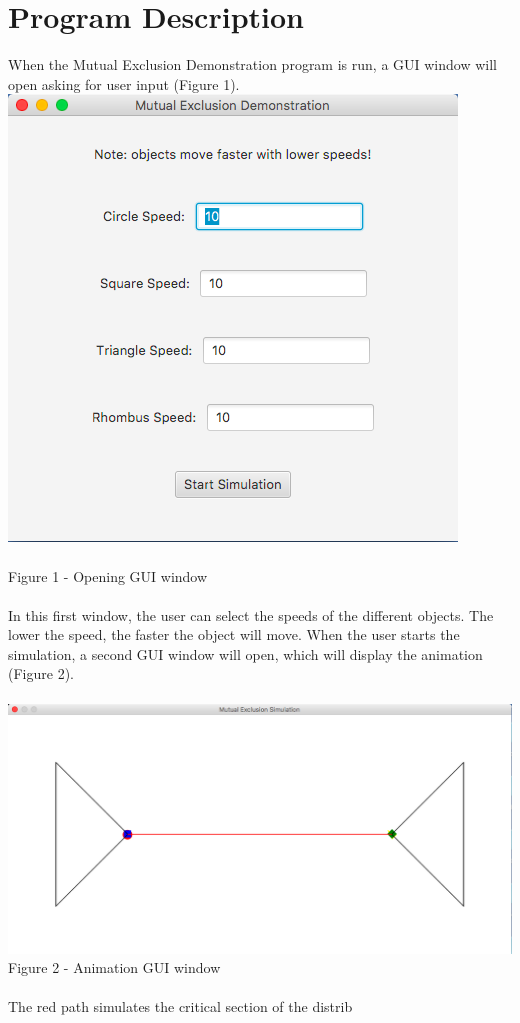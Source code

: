 \documentclass [11pt] {article}
\begin{document}
	\section {Program Description}
	When the Mutual Exclusion Demonstration program is run, a GUI window will open asking for user input (Figure 1).\\  \includegraphics [scale = 1] {Figure1}\\\\  Figure 1 - Opening GUI window\\\\  In this first window, the user can select the speeds of the different objects.  The lower the speed, the faster the object will move.  When the user starts the simulation, a second GUI window will open, which will display the animation (Figure 2).\\\\  \includegraphics [scale = .5] {Figure2}\\  Figure 2 - Animation GUI window\\\\  The red path simulates the critical section of the distrib
\end{document}
